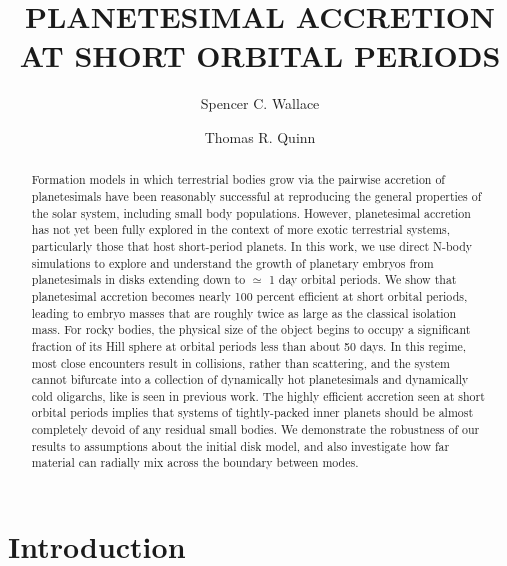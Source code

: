 \documentclass[twocolumn]{aastex63}
\begin{document}
\title{PLANETESIMAL ACCRETION AT SHORT ORBITAL PERIODS}

\author{Spencer C. Wallace}

\author{Thomas R. Quinn}

\begin{abstract}
Formation models in which terrestrial bodies grow via the pairwise
accretion of planetesimals have been reasonably successful at
reproducing the general properties of the solar system, including
small body populations. However, planetesimal accretion has not yet
been fully explored in the context of more exotic terrestrial systems,
particularly those that host short-period planets. In this work, we
use direct N-body simulations to explore and understand the growth of
planetary embryos from planetesimals in disks extending down to
$\simeq$ 1 day orbital periods. We show that planetesimal accretion
becomes nearly 100 percent efficient at short orbital periods, leading
to embryo masses that are roughly twice as large as the classical
isolation mass. For rocky bodies, the physical size of the object
begins to occupy a significant fraction of its Hill sphere at orbital
periods less than about 50 days. In this regime, most close encounters
result in collisions, rather than scattering, and the system cannot
bifurcate into a collection of dynamically hot planetesimals and
dynamically cold oligarchs, like is seen in previous work. The highly
efficient accretion seen at short orbital periods implies that systems
of tightly-packed inner planets should be almost completely devoid of
any residual small bodies. We demonstrate the robustness of our
results to assumptions about the initial disk model, and also
investigate how far material can radially mix across the boundary
between modes.
\end{abstract}

\section{Introduction} \label{sec:intro}
\end{document}
